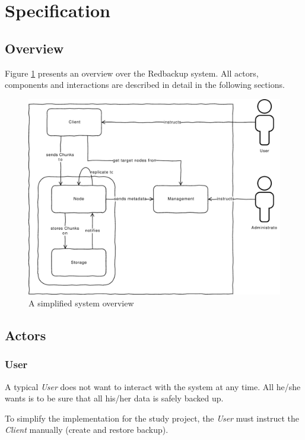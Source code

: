 
\section{Specification}\label{sec:specification}

\subsection{Overview}
Figure \ref{fig:architecture-overview} presents an overview over the Redbackup system. All actors, components and interactions are described in detail in the following sections.

\begin{figure}[h]
    \centering
    \includegraphics[width=1\linewidth]{resources/architecture_overview}
    \caption{A simplified system overview}
    \label{fig:architecture-overview}
\end{figure}

\subsection{Actors}

\subsubsection{User}
A typical \emph{User} does not want to interact with the system at any time. All he/she wants is to be sure that all his/her data is safely backed up.

To simplify the implementation for the study project, the \emph{User} must instruct the \emph{Client} manually (create and restore backup).

